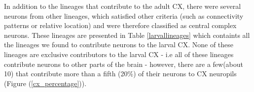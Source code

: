     In addition to the lineages that contribute to the adult CX, there were several neurons from other lineages, which satisfied other criteria (such as connectivity patterns or relative location) and were therefore classified as central complex neurons. These lineages are presented in Table \ref{larvallineages} which containts all the lineages we found to contribute neurons to the larval CX. None of these lineages are exclusive contributors to the larval CX - i.e all of these lineages contribute neurons to other parts of the brain - however, there are a few(about 10) that contribute more than a fifth (20\%) of their neurons to CX neuropils (Figure (\ref{cx_percentage})).


    \begin{table}
    \centering
\end{table}
